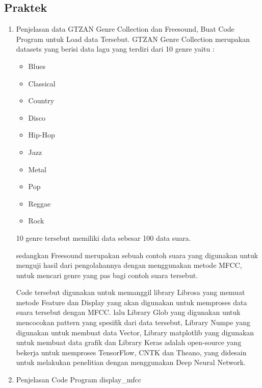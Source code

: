     \subsection{Praktek}
        \begin{enumerate}
            \item Penjelasan data GTZAN Genre Collection dan Freesound, Buat Code Program untuk Load data Tersebut.
            \subitem GTZAN Genre Collection merupakan datasets yang berisi data lagu yang terdiri dari 10 genre yaitu :
            \begin{itemize}
            \item Blues
            \item Classical
            \item Country
            \item Disco
            \item Hip-Hop
            \item Jazz
            \item Metal
            \item Pop
            \item Reggae
            \item Rock
            \end{itemize}
            10 genre tersebut memiliki data sebesar 100 data suara.
            
            \subitem sedangkan Freesound merupakan sebuah contoh suara yang digunakan untuk menguji hasil dari pengolahannya dengan menggunakan metode MFCC, untuk mencari genre yang pas bagi contoh suara tersebut.
            
            
            
            \subitem Code tersebut digunakan untuk memanggil library Librosa yang memuat metode Feature dan Display yang akan digunakan untuk memproses data suara tersebut dengan MFCC. lalu Library Glob yang digunakan untuk mencocokan pattern yang spesifik dari data tersebut, Library Numpe yang digunakan untuk membuat data Vector, Library matplotlib yang digunakan untuk membuat data grafik dan Library Keras adalah open-source yang bekerja untuk memproses TensorFlow, CNTK dan Theano, yang didesain untuk melakukan penelitian dengan menggunakan Deep Neural Network.
            
            \item Penjelasan Code Program display\_mfcc
            
            
            

\end{enumerate}
